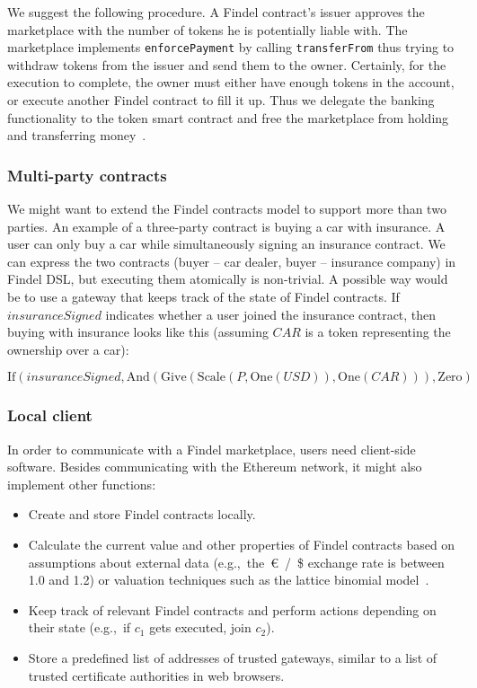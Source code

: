 We suggest the following procedure.
A Findel contract's issuer approves the marketplace with the number of tokens he is potentially liable with.
The marketplace implements \texttt{enforcePayment} by calling \texttt{transferFrom} thus trying to withdraw tokens from the issuer and send them to the owner.
Certainly, for the execution to complete, the owner must either have enough tokens in the account, or execute another Findel contract to fill it up.
Thus we delegate the banking functionality to the token smart contract and free the marketplace from holding and transferring money~\cite{Khovratovich2016}.


\subsubsection{Multi-party contracts}

We might want to extend the Findel contracts model to support more than two parties.
An example of a three-party contract is buying a car with insurance.
A user can only buy a car while simultaneously signing an insurance contract.
We can express the two contracts (buyer -- car dealer, buyer -- insurance company) in Findel DSL, but executing them atomically is non-trivial.
A possible way would be to use a gateway that keeps track of the state of Findel contracts.
If \(insuranceSigned\) indicates whether a user joined the insurance contract, then buying with insurance looks like this (assuming \(CAR\) is a token representing the ownership over a car):

\[\mathrm{If}(insuranceSigned,\mathrm{And}(\mathrm{Give}(\mathrm{Scale}(P,\mathrm{One}(USD)),\mathrm{One}(CAR))),\mathrm{Zero})\]


\subsubsection{Local client}

In order to communicate with a Findel marketplace, users need client-side software.
Besides communicating with the Ethereum network, it might also implement other functions:
\begin{itemize}
	\item Create and store Findel contracts locally.
	\item Calculate the current value and other properties of Findel contracts based on assumptions about external data (e.g.,~the~\euro~/~\$ exchange rate is between 1.0 and 1.2) or valuation techniques such as the lattice binomial model~\cite{Cox1979}.
	\item Keep track of relevant Findel contracts and perform actions depending on their state (e.g.,~if \(c_1\) gets executed, join \(c_2\)).
	\item Store a predefined list of addresses of trusted gateways, similar to a list of trusted certificate authorities in web browsers.
\end{itemize}


